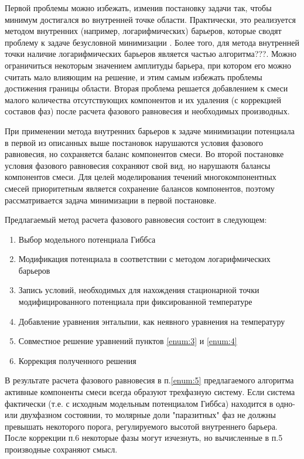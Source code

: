\documentclass[12pt]{article}
\begin{document}
Первой проблемы можно избежать, изменив постановку задачи так, чтобы минимум достигался во внутренней точке области. Практически, это реализуется методом внутренних (например, логарифмических) барьеров, которые сводят проблему к задаче безусловной минимизации \cite{Prigozhin}. Более того, для метода внутренней точки наличие логарифмических барьеров является частью алгоритма???. Можно ограничиться некоторым значением амплитуды барьера, при котором его можно считать мало влияющим на решение, и этим самым избежать проблемы достижения границы области. Вторая проблема решается добавлением к смеси малого количества отсутствующих компонентов и их удаления (с коррекцией составов фаз) после расчета фазового равновесия и необходимых производных.

При применении метода внутренних барьеров к задаче минимизации потенциала в первой из описанных выше постановок нарушаются условия фазового равновесия, но сохраняется баланс компонентов смеси. Во второй постановке условия фазового равновесия сохраняют свой вид, но нарушаютя балансы компонентов смеси. Для целей моделирования течений многокомпонентных смесей приоритетным является сохранение балансов компонентов, поэтому рассматривается задача минимизации в первой постановке.

Предлагаемый метод расчета фазового равновесия состоит в следующем:
\begin{enumerate}
    \item Выбор модельного потенциала Гиббса
    \item Модификация потенциала в соответствии с методом логарифмических барьеров
    \item \label{enum:3} Запись условий, необходимых для нахождения стационарной точки модифицированного потенциала при фиксированной температуре
    \item \label{enum:4} Добавление уравнения энтальпии, как неявного уравнения на температуру
    \item \label{enum:5} Совместное решение уравнений пунктов \ref{enum:3} и \ref{enum:4}
    \item Коррекция полученного решения
\end{enumerate}

В результате расчета фазового равновесия в п.\ref{enum:5} предлагаемого алгоритма активные компоненты смеси всегда образуют трехфазную систему. Если система фактически (т.е. с исходным модельным потенциалом Гиббса) находится в одно- или двухфазном состоянии, то молярные доли "паразитных" фаз не должны превышать некоторого порога, регулируемого высотой внутреннего барьера. После коррекции п.6 некоторые фазы могут изчезнуть, но вычисленные в п.5 производные сохраняют смысл.
\end{document}
